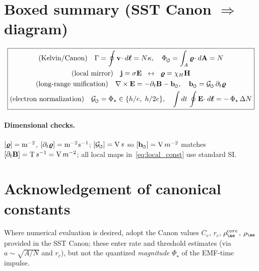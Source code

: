 \documentclass[reprint,aps,onecolumn,nofootinbib]{revtex4-2}
\newcommand{\swirlarrow}{%
	\mathchoice{\mkern-2mu\scriptstyle\boldsymbol{\circlearrowleft}}%
	{\mkern-2mu\scriptstyle\boldsymbol{\circlearrowleft}}%
	{\mkern-2mu\scriptscriptstyle\boldsymbol{\circlearrowleft}}%
	{\mkern-2mu\scriptscriptstyle\boldsymbol{\circlearrowleft}}%
}
\begin{document}
\section{Boxed summary (SST Canon $\Rightarrow$ diagram)}
\[
    \boxed{
        \begin{gathered}
        \text{(Kelvin/Canon)}\quad \Gamma=\oint \mathbf v\!\cdot d\boldsymbol\ell = N\kappa, \quad
        \Phi_{\swirlarrow}=\int_A \bm{\varrho}\!\cdot d\mathbf A=N \\
        \text{(local mirror)}\quad \mathbf j=\sigma\mathbf E \;\;\leftrightarrow\;\; \bm{\varrho}=\chi_H\mathbf H \\
        \text{(long-range unification)}\quad \nabla\times\mathbf E = -\partial_t\mathbf B - \mathbf b_{\swirlarrow},\quad
        \mathbf b_{\swirlarrow}=\mathcal G_{\swirlarrow}\,\partial_t\bm{\varrho} \\
        \text{(electron normalization)}\quad \mathcal G_{\swirlarrow}=\Phi_\star \in\{h/e,\;h/2e\},\quad
        \int dt\,\oint \mathbf E\!\cdot d\boldsymbol\ell = -\,\Phi_\star\,\Delta N
        \end{gathered}}
\]

\paragraph{Dimensional checks.}
    $[\bm{\varrho}]={\textrm m^{-2}}$, $[\partial_t\bm{\varrho}]={\textrm m^{-2}s^{-1}}$; $[\mathcal G_{\swirlarrow}]={\textrm V\,s}$ so $[\mathbf b_{\swirlarrow}]={\textrm V\,m^{-2}}$ matches $[\partial_t\mathbf B]={\textrm T\,s^{-1}}={\textrm V\,m^{-2}}$; all local maps in~\eqref{eq:local_const} use standard SI.

\section*{Acknowledgement of canonical constants}
Where numerical evaluation is desired, adopt the Canon values $C_e$, $r_c$, $\rho_{\ae}^{\textrm core}$, $\rho_{\ae}$ provided in the SST Canon; these enter rate and threshold estimates (via $a\sim \sqrt{A/N}$ and $r_c$), but not the quantized \emph{magnitude} $\Phi_\star$ of the EMF-time impulse.


\end{document}
